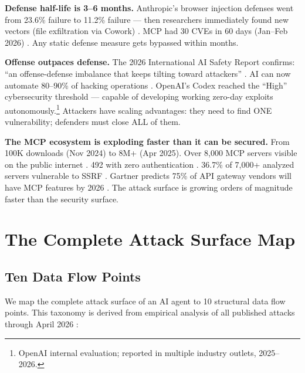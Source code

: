 \documentclass[11pt,letterpaper]{article}
\begin{document}
\textbf{Defense half-life is 3--6 months.} Anthropic's browser injection defenses went from 23.6\% failure to 11.2\% failure --- then researchers immediately found new vectors (file exfiltration via Cowork) \cite{anthropicrates}. MCP had 30 CVEs in 60 days (Jan--Feb 2026) \cite{checkmarx,cosai}. Any static defense measure gets bypassed within months.

\textbf{Offense outpaces defense.} The 2026 International AI Safety Report confirms: ``an offense-defense imbalance that keeps tilting toward attackers'' \cite{aisafety}. AI can now automate 80--90\% of hacking operations \cite{trendmicro}. OpenAI's Codex reached the ``High'' cybersecurity threshold --- capable of developing working zero-day exploits autonomously.\footnote{OpenAI internal evaluation; reported in multiple industry outlets, 2025--2026.} Attackers have scaling advantages: they need to find ONE vulnerability; defenders must close ALL of them.

\textbf{The MCP ecosystem is exploding faster than it can be secured.} From 100K downloads (Nov 2024) to 8M+ (Apr 2025). Over 8,000 MCP servers visible on the public internet \cite{checkmarx,paloalto}. 492 with zero authentication \cite{checkmarx}. 36.7\% of 7,000+ analyzed servers vulnerable to SSRF \cite{checkmarx}. Gartner predicts 75\% of API gateway vendors will have MCP features by 2026 \cite{gartner}. The attack surface is growing orders of magnitude faster than the security surface.


\section{The Complete Attack Surface Map}
\label{sec:attacksurface}

\subsection{Ten Data Flow Points}

We map the complete attack surface of an AI agent to 10 structural data flow points. This taxonomy is derived from empirical analysis of all published attacks through April 2026 \cite{kim2026,chhabra2025,promptkillchain,youraishell}:
\end{document}
